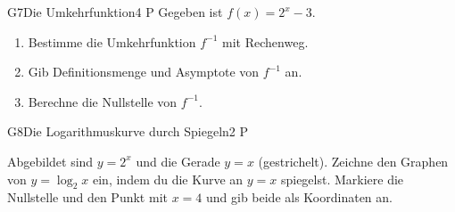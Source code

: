 \documentclass[11pt]{article}
\begin{document}
\begin{lpaufgabe}{G7}{Die Umkehrfunktion}{4 P}
Gegeben ist $f(x) = 2^{x} - 3$.
\begin{enumerate}[label=(\alph*),leftmargin=*,itemsep=1pt]
\item Bestimme die Umkehrfunktion $f^{-1}$ mit Rechenweg.
\item Gib Definitionsmenge und Asymptote von $f^{-1}$ an.
\item Berechne die Nullstelle von $f^{-1}$.
\end{enumerate}
\end{lpaufgabe}

\begin{lpaufgabe}{G8}{Die Logarithmuskurve durch Spiegeln}{2 P}
\begin{minipage}[t]{0.52\linewidth}
Abgebildet sind $y = 2^{x}$ und die Gerade $y = x$ (gestrichelt). Zeichne den Graphen von $y = \log_2 x$ ein, indem du die Kurve an $y = x$ spiegelst. Markiere die Nullstelle und den Punkt mit $x = 4$ und gib beide als Koordinaten an.
\end{minipage}\hfill
\begin{minipage}[t]{0.42\linewidth}\vspace{0pt}\centering
{}
\end{minipage}
\end{lpaufgabe}
\end{document}
